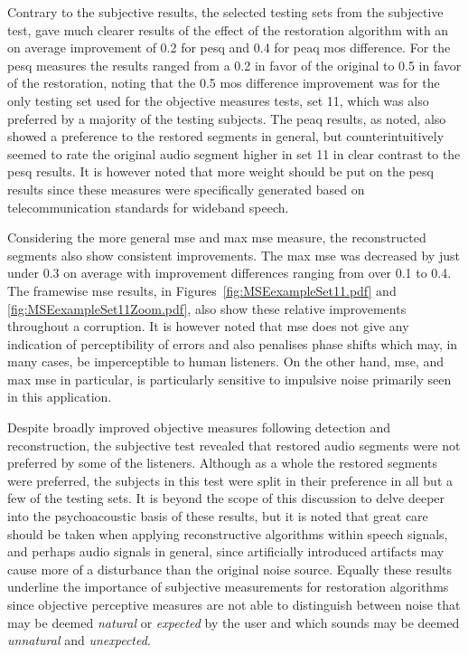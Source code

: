 Contrary to the subjective results, the selected testing sets from the subjective test, gave much clearer results of the effect of the restoration algorithm with an on average improvement of 0.2 for \gls{pesq} and 0.4 for \gls{peaq} \gls{mos} difference. For the \gls{pesq} measures the results ranged from a 0.2 in favor of the original to 0.5 in favor of the restoration, noting that the 0.5 \gls{mos} difference improvement was for the only testing set used for the objective measures tests, set 11, which was also preferred by a majority of the testing subjects. The \gls{peaq} results, as noted, also showed a preference to the restored segments in general, but counterintuitively seemed to rate the original audio segment higher in set 11 in clear contrast to the \gls{pesq} results. It is however noted that more weight should be put on the \gls{pesq} results since these measures were specifically generated based on telecommunication standards for wideband speech.

Considering the more general \gls{mse} and max \gls{mse} measure, the reconstructed segments also show consistent improvements. The max \gls{mse} was decreased by just under 0.3 on average with improvement differences ranging from over 0.1 to 0.4. The framewise \gls{mse} results, in Figures~\ref{fig:MSEexampleSet11.pdf} and \ref{fig:MSEexampleSet11Zoom.pdf}, also show these relative improvements throughout a corruption. It is however noted that \gls{mse} does not give any indication of perceptibility of errors and also penalises phase shifts which may, in many cases, be imperceptible to human listeners. On the other hand, \gls{mse}, and max \gls{mse} in particular, is particularly sensitive to impulsive noise primarily seen in this application.


Despite broadly improved objective measures following detection and reconstruction, the subjective test revealed that restored audio segments were not preferred by some of the listeners. Although as a whole the restored segments were preferred, the subjects in this test were split in their preference in all but a few of the testing sets. It is beyond the scope of this discussion to delve deeper into the psychoacoustic basis of these results, but it is noted that great care should be taken when applying reconstructive algorithms within speech signals, and perhaps audio signals in general, since artificially introduced artifacts may cause more of a disturbance than the original noise source. Equally these results underline the importance of subjective measurements for restoration algorithms since objective perceptive measures are not able to distinguish between noise that may be deemed \emph{natural} or \emph{expected} by the user and which sounds may be deemed \emph{unnatural} and \emph{unexpected}.

